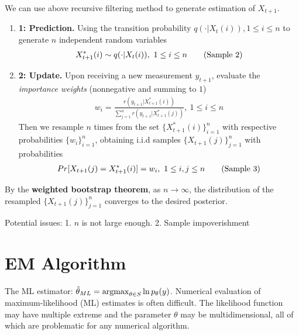 \documentclass[11pt,a4paper]{article}
\newcommand{\argmax}{\operatornamewithlimits{argmax}}
\begin{document}
We can use above recursive filtering method to generate estimation of $X_{t+1}$.
\begin{enumerate}
    \item \textbf{ 1: Prediction.} Using the transition probability $q(\cdot|X_t(i)),1\leq i\leq n$ to generate $n$ independent random variables
    \begin{equation}
        \begin{aligned}
            X^*_{t+1}(i)\sim q(\cdot|X_t(i)),\ 1\leq i\leq n
        \end{aligned}
        \tag{\text{Sample 2}}
    \end{equation}
    \item \textbf{ 2: Update.} Upon receiving a new measurement $y_{t+1}$, evaluate the \textit{importance weights} (nonnegative and summing to $1$)
    \begin{equation}
        \begin{aligned}
            w_i=\frac{r(y_{t+1}|X_{t+1}^*(i))}{\sum_{j=1}^n r(y_{t+1}|X_{t+1}^*(j))},\ 1\leq i\leq n
        \end{aligned}
        \nonumber
    \end{equation}
    Then we resample $n$ times from the set $\{X_{t+1}^*(i)\}_{i=1}^n$ with respective probabilities $\{w_i\}_{i=1}^n$, obtaining i.i.d samples $\{X_{t+1}(j)\}_{j=1}^n$ with probabilities
    \begin{equation}
        \begin{aligned}
            Pr[X_{t+1}(j)=X_{t+1}^*(i)]=w_i,\ 1\leq i,j\leq n
        \end{aligned}
        \tag{\text{Sample 3}}
    \end{equation}
\end{enumerate}
By the \textbf{weighted bootstrap theorem}, as $n \rightarrow \infty$, the distribution of the
resampled $\{X_{t+1}(j)\}_{j=1}^n$ converges to the desired posterior.


Potential issues: 1. $n$ is not large enough. 2. Sample impoverishment





\section{EM Algorithm}

The ML estimator: $\hat{\theta}_{ML}=\argmax_{\theta\in S}\ln p_\theta(y)$. Numerical evaluation of maximum-likelihood (ML) estimates is often difficult. The likelihood function may have multiple extreme and the parameter $\theta$ may be multidimensional, all of which are problematic for any numerical algorithm.
\end{document}
